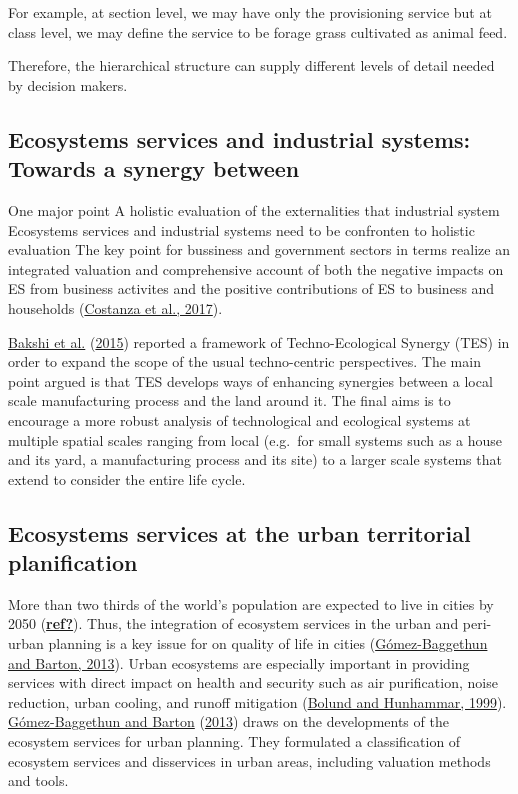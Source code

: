 \documentclass[]{elsarticle} %
\begin{document}
For example, at section level, we may have only the provisioning service but at class level, we may define the service to be forage grass cultivated as animal feed.

Therefore, the hierarchical structure can supply different levels of detail needed by decision makers.

\hypertarget{ecosystems-services-and-industrial-systems-towards-a-synergy-between}{%
\subsection{Ecosystems services and industrial systems: Towards a synergy between}\label{ecosystems-services-and-industrial-systems-towards-a-synergy-between}}

One major point A holistic evaluation of the externalities that industrial system
Ecosystems services and industrial systems need to be confronten to holistic evaluation
The key point for bussiness and government sectors in terms realize an integrated valuation and comprehensive account of both the negative impacts on ES from business activites and the positive contributions of ES to business and households (\protect\hyperlink{ref-Costanza2017}{Costanza et al., 2017}).

\protect\hyperlink{ref-Bakshi2015}{Bakshi et al.} (\protect\hyperlink{ref-Bakshi2015}{2015}) reported a framework of Techno-Ecological Synergy (TES) in order to expand the scope of the usual techno-centric perspectives.
The main point argued is that TES develops ways of enhancing synergies between a local scale manufacturing process and the land around it.
The final aims is to encourage a more robust analysis of technological and ecological systems at multiple spatial scales ranging from local (e.g.~for small systems such as a house and its yard, a manufacturing process and its site) to a larger scale systems that extend to consider the entire life cycle.

\hypertarget{ecosystems-services-at-the-urban-territorial-planification}{%
\subsection{Ecosystems services at the urban territorial planification}\label{ecosystems-services-at-the-urban-territorial-planification}}

More than two thirds of the world's population are expected to live in cities by 2050 (\protect\hyperlink{ref-ref}{\textbf{ref?}}).
Thus, the integration of ecosystem services in the urban and peri-urban planning is a key issue for on quality of life in cities (\protect\hyperlink{ref-Gomez-Baggethun2013}{Gómez-Baggethun and Barton, 2013}).
Urban ecosystems are especially important in providing services with direct impact on health and security such as air purification, noise reduction, urban
cooling, and runoff mitigation (\protect\hyperlink{ref-Bolund1999}{Bolund and Hunhammar, 1999}).
\protect\hyperlink{ref-Gomez-Baggethun2013}{Gómez-Baggethun and Barton} (\protect\hyperlink{ref-Gomez-Baggethun2013}{2013}) draws on the developments of the ecosystem services for urban planning.
They formulated a classification of ecosystem services and disservices in urban areas, including valuation methods and tools.
\end{document}
